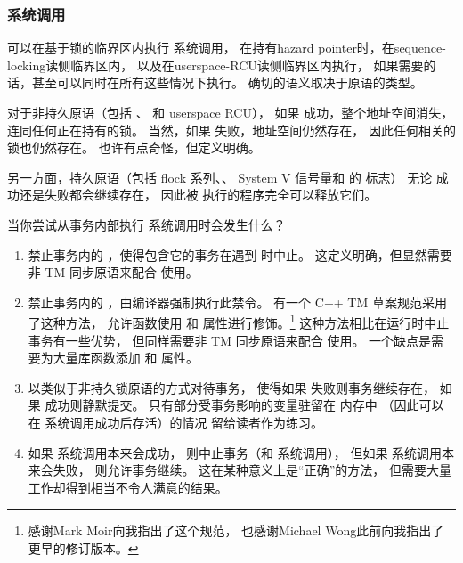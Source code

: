 \subsubsection{系统调用}
\label{sec:future:The exec System Call}

可以在基于锁的临界区内执行  系统调用，
在持有hazard pointer时，在sequence-locking读侧临界区内，
以及在userspace-RCU读侧临界区内执行，
如果需要的话，甚至可以同时在所有这些情况下执行。
确切的语义取决于原语的类型。

对于非持久原语（包括 、
 和 userspace RCU），
如果  成功，整个地址空间消失，
连同任何正在持有的锁。
当然，如果  失败，地址空间仍然存在，
因此任何相关的锁也仍然存在。
也许有点奇怪，但定义明确。

另一方面，持久原语（包括 flock 系列、、
System V 信号量和  的  标志）
无论  成功还是失败都会继续存在，
因此被  执行的程序完全可以释放它们。

\QuickQuizEnd

当你尝试从事务内部执行  系统调用时会发生什么？

\begin{enumerate}
\item	禁止事务内的 ，使得包含它的事务在遇到  时中止。
	这定义明确，但显然需要非 TM 同步原语来配合  使用。
\item	禁止事务内的 ，由编译器强制执行此禁令。
	有一个 C++ TM 草案规范采用了这种方法，
	允许函数使用  和 
	属性进行修饰。\footnote{
		感谢Mark Moir向我指出了这个规范，
		也感谢Michael Wong此前向我指出了更早的修订版本。}
	这种方法相比在运行时中止事务有一些优势，
	但同样需要非 TM 同步原语来配合  使用。
	一个缺点是需要为大量库函数添加  和
	 属性。
\item	以类似于非持久锁原语的方式对待事务，
	使得如果  失败则事务继续存在，
	如果  成功则静默提交。
	只有部分受事务影响的变量驻留在  内存中
	（因此可以在  系统调用成功后存活）的情况
	留给读者作为练习。
\item	如果  系统调用本来会成功，
	则中止事务（和  系统调用），
	但如果  系统调用本来会失败，
	则允许事务继续。
	这在某种意义上是``正确''的方法，
	但需要大量工作却得到相当不令人满意的结果。
\end{enumerate}

